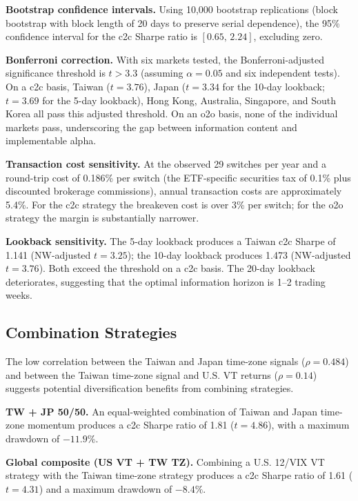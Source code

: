 \textbf{Bootstrap confidence intervals.} Using 10,000 bootstrap replications (block bootstrap with block length of 20 days to preserve serial dependence), the 95\% confidence interval for the c2c Sharpe ratio is $[0.65, \, 2.24]$, excluding zero.

\textbf{Bonferroni correction.} With six markets tested, the Bonferroni-adjusted significance threshold is $t > 3.3$ (assuming $\alpha = 0.05$ and six independent tests). On a c2c basis, Taiwan ($t = 3.76$), Japan ($t = 3.34$ for the 10-day lookback; $t = 3.69$ for the 5-day lookback), Hong Kong, Australia, Singapore, and South Korea all pass this adjusted threshold. On an o2o basis, none of the individual markets pass, underscoring the gap between information content and implementable alpha.

\textbf{Transaction cost sensitivity.} At the observed 29 switches per year and a round-trip cost of 0.186\% per switch (the ETF-specific securities tax of 0.1\% plus discounted brokerage commissions), annual transaction costs are approximately 5.4\%. For the c2c strategy the breakeven cost is over 3\% per switch; for the o2o strategy the margin is substantially narrower.

\textbf{Lookback sensitivity.} The 5-day lookback produces a Taiwan c2c Sharpe of 1.141 (NW-adjusted $t = 3.25$); the 10-day lookback produces 1.473 (NW-adjusted $t = 3.76$). Both exceed the \citet{harvey2016} threshold on a c2c basis. The 20-day lookback deteriorates, suggesting that the optimal information horizon is 1--2 trading weeks.

\subsection{Combination Strategies}

The low correlation between the Taiwan and Japan time-zone signals ($\rho = 0.484$) and between the Taiwan time-zone signal and U.S. VT returns ($\rho = 0.14$) suggests potential diversification benefits from combining strategies.

\textbf{TW + JP 50/50.} An equal-weighted combination of Taiwan and Japan time-zone momentum produces a c2c Sharpe ratio of 1.81 ($t = 4.86$), with a maximum drawdown of $-11.9\%$.

\textbf{Global composite (US VT + TW TZ).} Combining a U.S. 12/VIX VT strategy with the Taiwan time-zone strategy produces a c2c Sharpe ratio of 1.61 ($t = 4.31$) and a maximum drawdown of $-8.4\%$.

